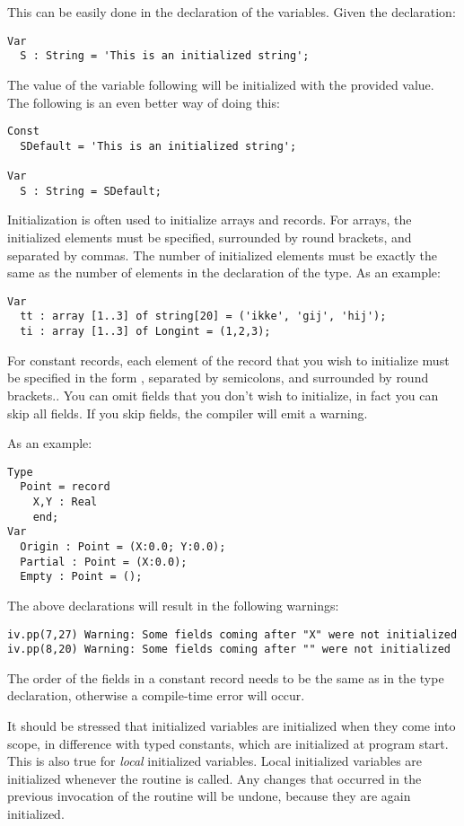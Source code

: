 This can be easily done in the declaration of the variables.
Given the declaration:
\begin{verbatim}
Var
  S : String = 'This is an initialized string';
\end{verbatim}
The value of the variable following will be initialized with the provided
value. The following is an even better way of doing this:
\begin{verbatim}
Const
  SDefault = 'This is an initialized string';

Var
  S : String = SDefault;
\end{verbatim}
Initialization is often used to initialize arrays and records. For arrays,
the initialized elements must be specified, surrounded by round brackets, and
separated by commas. The number of initialized elements must be exactly the
same as the number of elements in the declaration of the type.
As an example:
\begin{verbatim}
Var
  tt : array [1..3] of string[20] = ('ikke', 'gij', 'hij');
  ti : array [1..3] of Longint = (1,2,3);
\end{verbatim}
For constant records, each element of the record that you wish to initialize
must be specified in the form , separated by semicolons, 
and surrounded by round brackets.. You can omit
fields that you don't wish to initialize, in fact you can skip all fields.
If you skip fields, the compiler will emit a warning.

As an example:
\begin{verbatim}
Type
  Point = record
    X,Y : Real
    end;
Var
  Origin : Point = (X:0.0; Y:0.0);
  Partial : Point = (X:0.0);
  Empty : Point = ();
\end{verbatim}
The above declarations will result in the following warnings:
\begin{verbatim}
iv.pp(7,27) Warning: Some fields coming after "X" were not initialized
iv.pp(8,20) Warning: Some fields coming after "" were not initialized
\end{verbatim}

The order of the fields in a constant record needs to be the same as in the type
declaration, otherwise a compile-time error will occur. 

\begin{remark}
It should be stressed that initialized variables are initialized when they
come into scope, in difference with typed constants, which are initialized
at program start.
This is also true for {\em local} initialized variables. Local initialized
variables are initialized whenever the routine is called. Any changes that
occurred in the previous invocation of the routine will be undone, because
they are again initialized.
\end{remark}

